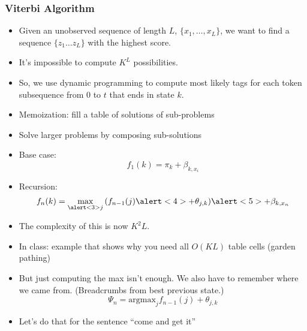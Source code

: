 \documentclass[compress]{beamer}
\begin{document}
\begin{frame}
\frametitle{Viterbi Algorithm}

\begin{itemize}
\item Given an unobserved sequence of length $L$, $\{x_1, \dots, x_L\}$, we want to find a sequence $\{z_1 \dots z_L\}$ with the highest score.
\pause
\item It's impossible to compute $K^L$ possibilities.
\item So, we use dynamic programming to compute most likely tags for
  each token subsequence from $0$ to $t$ that ends in state $k$.
\item Memoization: fill a table of solutions of sub-problems
\item Solve larger problems by composing sub-solutions
\item Base case:
\begin{equation}
f_1(k) = \pi_k + \beta_{k, x_i}
\end{equation}
\item Recursion:
\begin{equation}
f_n(k) = \max_{\alert<3>{j}}
{\left(f_{n-1}(j)\alert<4>{+ \theta_{j,k}}\right)} \alert<5>{+ \beta_{k, x_n}}\end{equation}
\end{itemize}

\end{frame}

\begin{frame}

\begin{itemize}
\item The complexity of this is now $K^2 L$.
\item In class: example that shows why you need all $O(KL)$ table cells (garden pathing)
\item But just computing the max isn't enough.  We also have to remember where we came from.  (Breadcrumbs from best previous state.)
\begin{equation}
\Psi_{n} = \mbox{argmax}_j f_{n-1}(j) + \theta_{j,k}
\end{equation}
\pause
\item Let's do that for the sentence ``come and get it''

\end{itemize}
\end{frame}
\end{document}
